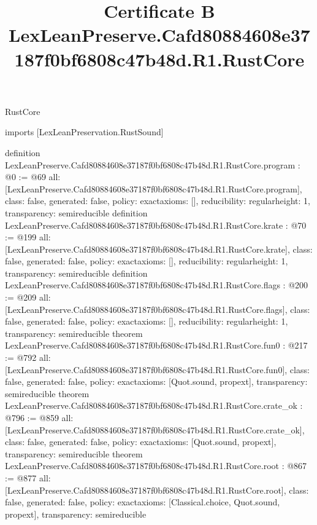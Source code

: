 \begin{lexlean}{RustCore}
\title{Certificate B LexLeanPreserve.Cafd80884608e37187f0bf6808c47b48d.R1.RustCore}
\begin{coremodule}
imports [LexLeanPreservation.RustSound]

definition LexLeanPreserve.Cafd80884608e37187f0bf6808c47b48d.R1.RustCore.program : @0 := @69 {
  all: [LexLeanPreserve.Cafd80884608e37187f0bf6808c47b48d.R1.RustCore.program],
  class: false,
  generated: false,
  policy: exact{axioms: []},
  reducibility: regular{height: 1},
  transparency: semireducible
}
definition LexLeanPreserve.Cafd80884608e37187f0bf6808c47b48d.R1.RustCore.krate : @70 := @199 {
  all: [LexLeanPreserve.Cafd80884608e37187f0bf6808c47b48d.R1.RustCore.krate],
  class: false,
  generated: false,
  policy: exact{axioms: []},
  reducibility: regular{height: 1},
  transparency: semireducible
}
definition LexLeanPreserve.Cafd80884608e37187f0bf6808c47b48d.R1.RustCore.flags : @200 := @209 {
  all: [LexLeanPreserve.Cafd80884608e37187f0bf6808c47b48d.R1.RustCore.flags],
  class: false,
  generated: false,
  policy: exact{axioms: []},
  reducibility: regular{height: 1},
  transparency: semireducible
}
theorem LexLeanPreserve.Cafd80884608e37187f0bf6808c47b48d.R1.RustCore.fun0 : @217 := @792 {
  all: [LexLeanPreserve.Cafd80884608e37187f0bf6808c47b48d.R1.RustCore.fun0],
  class: false,
  generated: false,
  policy: exact{axioms: [Quot.sound, propext]},
  transparency: semireducible
}
theorem LexLeanPreserve.Cafd80884608e37187f0bf6808c47b48d.R1.RustCore.crate_ok : @796 := @859 {
  all: [LexLeanPreserve.Cafd80884608e37187f0bf6808c47b48d.R1.RustCore.crate_ok],
  class: false,
  generated: false,
  policy: exact{axioms: [Quot.sound, propext]},
  transparency: semireducible
}
theorem LexLeanPreserve.Cafd80884608e37187f0bf6808c47b48d.R1.RustCore.root : @867 := @877 {
  all: [LexLeanPreserve.Cafd80884608e37187f0bf6808c47b48d.R1.RustCore.root],
  class: false,
  generated: false,
  policy: exact{axioms: [Classical.choice, Quot.sound, propext]},
  transparency: semireducible
}


\end{coremodule}
\end{lexlean}

